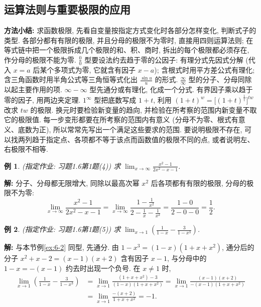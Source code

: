 \documentclass[UTF8,openany]{ctexbook}
\theoremstyle{chinesetextbook}
\newtheorem{example}{例}[section]
\newenvironment{cnsolution}{\par\indent\textbf{解:} \ignorespaces}{\par}
\begin{document}
\subsection{运算法则与重要极限的应用}
\par\indent\textbf{方法小结:} 求函数极限, 先看自变量按指定方式变化时各部分怎样变化, 判断式子的类型. 各部分都有有限的极限, 并且分母的极限不为零时, 直接用四则运算法则; 在等式链中把一个极限拆成几个极限的和、积、商时, 拆出的每个极限都必须存在, 作分母的极限不能为零. $\displaystyle\frac00$ 型要设法约去趋于零的公因子: 有理分式先因式分解 (代入 $x=a$ 后某个多项式为零, 它就含有因子 $x-a$); 含根式时用平方差公式有理化; 含三角函数时用半角公式等三角恒等式化出 $\displaystyle\frac{\sin u}u$ 的形式. $\displaystyle\frac\infty\infty$ 型的分子、分母同除以起主要作用的项. $\infty-\infty$ 型先通分或有理化, 化成一个分式. 有界因子乘以趋于零的因子, 用两边夹定理. $1^\infty$ 型把底数写成 $1+t$, 利用 $(1+t)^w=\bigl[(1+t)^{\frac1t}\bigr]^{tw}$ 改求 $tw$ 的极限. 换元时要检验新变量的趋向, 并检验在所考察的范围内新变量不取它的极限值. 每一步变形都要在所考察的范围内有意义 (分母不为零、根式有意义、底数为正), 所以常常先写出一个满足这些要求的范围. 要说明极限不存在, 可以找两列趋于指定点、各项都不等于该点而函数值的极限不同的点, 或者说明左、右极限不相等.
\begin{example}
\textnormal{(指定作业: 习题1.6第1题(4))} 求 $\displaystyle\lim_{x\to\infty}\frac{x^2-1}{2x^2-x-1}$.
\end{example}
\begin{cnsolution}
分子、分母都无限增大, 同除以最高次幂 $x^2$ 后各项都有有限的极限, 分母的极限不为零:
\[
\lim_{x\to\infty}\frac{x^2-1}{2x^2-x-1}=\lim_{x\to\infty}\frac{1-\frac1{x^2}}{2-\frac1x-\frac1{x^2}}=\frac{1-0}{2-0-0}=\frac12.
\]
\end{cnsolution}
\begin{example}
\textnormal{(指定作业: 习题1.6第1题(5))} 求 $\displaystyle\lim_{x\to1}\left(\frac1{1-x}-\frac3{1-x^3}\right)$.
\end{example}
\begin{cnsolution}
与本节例\ref{ex:6-2} 同型, 先通分. 由 $1-x^3=(1-x)(1+x+x^2)$, 通分后的分子 $x^2+x-2=(x-1)(x+2)$ 含有因子 $x-1$, 与分母中的 $1-x=-(x-1)$ 约去时出现一个负号. 在 $x\ne1$ 时,
\[
\begin{aligned}
\lim_{x\to1}\left(\frac1{1-x}-\frac3{1-x^3}\right)
&=\lim_{x\to1}\frac{(1+x+x^2)-3}{(1-x)(1+x+x^2)}=\lim_{x\to1}\frac{(x-1)(x+2)}{-(x-1)(1+x+x^2)}\\
&=\lim_{x\to1}\frac{-(x+2)}{1+x+x^2}=-1.
\end{aligned}
\]
\end{cnsolution}
\end{document}
